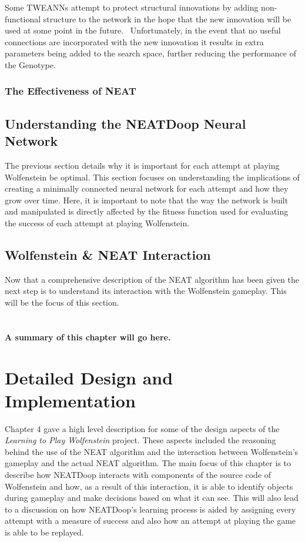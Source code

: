 \documentclass[]{Learning-to-Play-Wolfenstein-thesis}
\begin{document}
Some TWEANNs attempt to protect structural innovations by adding non-functional structure to the network in the hope that the new innovation will be used at some point in the future.~\cite{GNARL} Unfortunately, in the event that no useful connections are incorporated with the new innovation it results in extra parameters being added to the search space, further reducing the performance of the Genotype.

\subsection{The Effectiveness of NEAT}


\section{Understanding the NEATDoop Neural Network}
The previous section details why it is important for each attempt at playing Wolfenstein be optimal. This section focuses on understanding the implications of creating a minimally connected neural network for each attempt and how they grow over time. Here, it is important to note that the way the network is built and manipulated is directly affected by the fitness function used for evaluating the success of each attempt at playing Wolfenstein.

\section{Wolfenstein \& NEAT Interaction}
Now that a comprehensive description of the NEAT algorithm has been given the next step is to understand its interaction with the Wolfenstein gameplay. This will be the focus of this section. \\\\\\\textbf{A summary of this chapter will go here.}

\chapter{\label{Chapter5}Detailed Design and Implementation}%
Chapter 4 gave a high level description for some of the design aspects of the \textit{Learning to Play Wolfenstein} project. These aspects included the reasoning behind the use of the NEAT algorithm and the interaction between Wolfenstein's gameplay and the actual NEAT algorithm. The main focus of this chapter is to describe how NEATDoop interacts with components of the source code of Wolfenstein and how, as a result of this interaction, it is able to identify objects during gameplay and make decisions based on what it can see. This will also lead to a discussion on how NEATDoop's learning process is aided by assigning every attempt with a measure of success and also how an attempt at playing the game is able to be replayed. 
\end{document}
